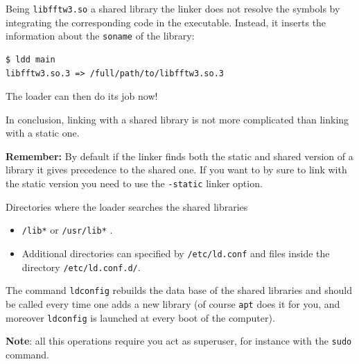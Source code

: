 \documentclass[10pt,aspectratio=169]{beamer}
\begin{document}
\begin{frame}[fragile]

  Being \texttt{libfftw3.so} a shared library the linker does not
  resolve the symbols by integrating the corresponding code in the
  executable. Instead, it inserts the information about the
  \texttt{soname} of the library:
  \smallskip

\begin{verbatim}
$ ldd main
libfftw3.so.3 => /full/path/to/libfftw3.so.3
\end{verbatim}
\smallskip
The loader can then do its job now!
\smallskip

In conclusion, linking with a shared library is not more complicated
than linking with a static one.
\medskip

\textbf{Remember:} By default if the linker finds both the static and
shared version of a library it gives precedence to the shared
one. If you want to by sure to link with the static version you need to use 
the \texttt{-static} linker option.
\end{frame}

\begin{frame}{Directories where the loader searches the shared libraries}  
	
	\begin{itemize}
		\item  \texttt{/lib*} or  \texttt{/usr/lib*} .
		\item Additional directories can specified by \texttt{/etc/ld.conf} and files inside the directory \texttt{/etc/ld.conf.d/}.
	\end{itemize}


  The command \texttt{ldconfig} rebuilds the data base of the shared
  libraries and should be called every time one adds a new library (of
  course \texttt{apt} does it for you, and moreover
  \texttt{ldconfig} is launched at every boot of the computer).
  \smallskip

  \textbf{Note}: all this operations require you act as superuser, for
  instance with the \texttt{sudo} command.
\end{frame}
\end{document}

